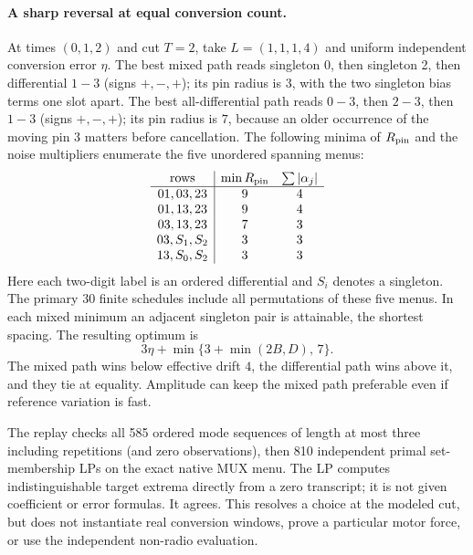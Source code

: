 \documentclass{article}
\begin{document}
\paragraph{A sharp reversal at equal conversion count.}
At times $(0,1,2)$ and cut $T=2$, take $L=(1,1,1,4)$
and uniform independent conversion error $\eta$.
The best mixed path reads singleton 0, then singleton 2,
then differential $1-3$ (signs $+,-,+$); its pin radius is $3$,
with the two singleton bias terms one slot apart. The best
all-differential path reads $0-3$, then $2-3$, then $1-3$
(signs $+,-,+$); its pin radius is $7$, because an older
occurrence of the moving pin 3 matters before cancellation.
The following minima of $R_{\rm pin}$ and the noise
multipliers enumerate the five unordered spanning menus:
\[
\begin{array}{c|cc}
\text{rows}& \min R_{\rm pin} & \sum |\alpha_j|\\ \hline
 01,03,23 &9&4\\
 01,13,23 &9&4\\
 03,13,23 &7&3\\
 03,S_1,S_2 &3&3\\
 13,S_0,S_2 &3&3
\end{array}
\]
Here each two-digit label is an ordered differential and
$S_i$ denotes a singleton. The primary 30 finite schedules include
all permutations of these five menus. In each mixed minimum an
adjacent singleton pair is attainable, the shortest spacing. The
resulting optimum is
\[
  3\eta+\min\{3+\min(2B,D),\,7\}.
\]
The mixed path wins below effective drift $4$, the differential
path wins above it, and they tie at equality. Amplitude can keep
the mixed path preferable even if reference variation is fast.

The replay checks all 585 ordered mode sequences of length at most
three including repetitions (and zero observations), then 810
independent primal set-membership LPs on the exact native MUX menu.
The LP computes indistinguishable target extrema directly from
a zero transcript; it is not given coefficient or error formulas.
It agrees. This resolves a choice at the modeled cut, but does not
instantiate real conversion windows, prove a particular motor
force, or use the independent non-radio evaluation.
\end{document}
